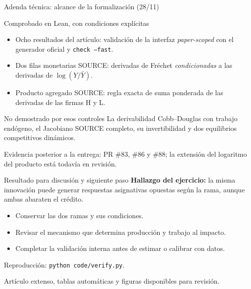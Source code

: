 \documentclass[aspectratio=169,11pt]{beamer}
\begin{document}
\begin{frame}{Adenda técnica: alcance de la formalización (28/11)}
\small
\begin{block}{Comprobado en Lean, con condiciones explícitas}
\begin{itemize}
\item Ocho resultados del artículo: validación de la interfaz
\emph{paper-scoped} con el generador oficial y \texttt{check --fast}.
\item Dos filas monetarias SOURCE: derivadas de Fréchet
\emph{condicionadas} a las derivadas de $\log(Y/\bar Y)$.
\item Producto agregado SOURCE: regla exacta de suma ponderada
de las derivadas de las firmas H y L.
\end{itemize}
\end{block}
\begin{alertblock}{No demostrado por esos controles}
La derivabilidad Cobb--Douglas con trabajo endógeno, el Jacobiano
SOURCE completo, su invertibilidad y dos equilibrios competitivos dinámicos.
\end{alertblock}
\footnotesize
Evidencia posterior a la entrega: PR \#83, \#86 y \#88;
la extensión del logaritmo del producto está todavía en revisión.
\end{frame}

\begin{frame}{Resultado para discusión y siguiente paso}
\textbf{Hallazgo del ejercicio:} la misma innovación puede generar respuestas
asignativas opuestas según la rama, aunque ambas abaraten el crédito.
\medskip
\begin{itemize}
\item Conservar las dos ramas y sus condiciones.
\item Revisar el mecanismo que determina producción y trabajo al impacto.
\item Completar la validación interna antes de estimar o calibrar con datos.
\end{itemize}
\medskip
Reproducción: \texttt{python code/verify.py}.
\par Artículo extenso, tablas automáticas y figuras disponibles para revisión.
\end{frame}
\end{document}
